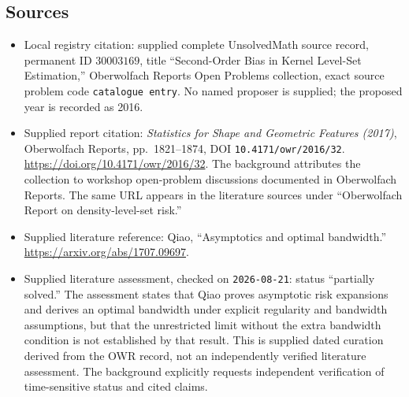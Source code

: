 \documentclass[11pt]{article}
\begin{document}
\subsection{Sources}
\begin{itemize}
\item Local registry citation: supplied complete UnsolvedMath source record, permanent ID \(30003169\), title ``Second-Order Bias in Kernel Level-Set Estimation,'' Oberwolfach Reports Open Problems collection, exact source problem code \texttt{catalogue entry}. No named proposer is supplied; the proposed year is recorded as 2016.
\item Supplied report citation: \emph{Statistics for Shape and Geometric Features (2017)}, Oberwolfach Reports, pp.\ 1821--1874, DOI \texttt{10.4171/owr/2016/32}. \url{https://doi.org/10.4171/owr/2016/32}. The background attributes the collection to workshop open-problem discussions documented in Oberwolfach Reports. The same URL appears in the literature sources under ``Oberwolfach Report on density-level-set risk.''
\item Supplied literature reference: Qiao, ``Asymptotics and optimal bandwidth.'' \url{https://arxiv.org/abs/1707.09697}.
\item Supplied literature assessment, checked on \texttt{2026-08-21}: status ``partially solved.'' The assessment states that Qiao proves asymptotic risk expansions and derives an optimal bandwidth under explicit regularity and bandwidth assumptions, but that the unrestricted limit without the extra bandwidth condition is not established by that result. This is supplied dated curation derived from the OWR record, not an independently verified literature assessment. The background explicitly requests independent verification of time-sensitive status and cited claims.
\end{itemize}
\end{document}
